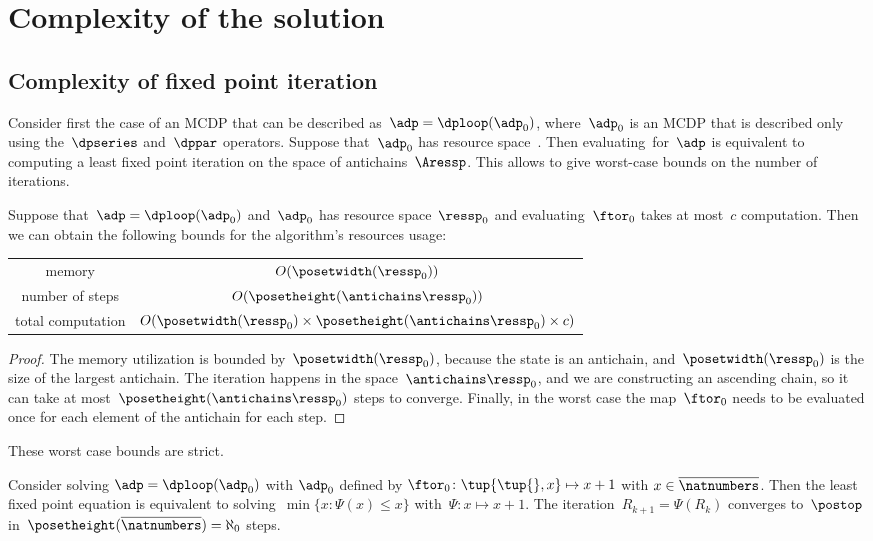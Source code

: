 

\section{Complexity of the solution}

\subsection{Complexity of fixed point iteration}

Consider first the case of an MCDP that can be described as~$\adp=\dploop(\adp_{0})$,
where~$\adp_{0}$ is an MCDP that is described only using the~$\dpseries$
and~$\dppar$ operators. Suppose that~$\adp_{0}$ has resource
space~\ressp. Then evaluating~\ftor for~$\adp$ is equivalent
to computing a least fixed point iteration on the space of antichains~$\Aressp$.
This allows to give worst-case bounds on the number of iterations.

\begin{proposition}
    \label{prop:complexity}
    Suppose that~$\adp=\dploop(\adp_{0})$ and~$\adp_{0}$ has resource space~$\ressp_{0}$ and evaluating~$\ftor_{0}$ takes at most~$c$ computation. Then we can obtain the following bounds for the algorithm's resources usage:

    \smallskip{}
    \begin{tabular}{cc}
        memory & $O(\posetwidth(\ressp_{0}))$\tabularnewline
        number of steps & $O(\posetheight(\antichains\ressp_{0}))$\tabularnewline
        total computation & $O(\posetwidth(\ressp_{0})\times\posetheight(\antichains\ressp_{0})\times c)$\tabularnewline
    \end{tabular}

\end{proposition}
\begin{proof}
    The memory utilization is bounded by~$\posetwidth(\ressp_{0})$, because the state is an antichain, and~$\posetwidth(\ressp_{0})$ is the size of the largest antichain. The iteration happens in the space~$\antichains\ressp_{0}$, and we are constructing an ascending chain, so it can take at most~$\posetheight(\antichains\ressp_{0})$ steps to converge. Finally, in the worst case the map~$\ftor_{0}$ needs to be evaluated once for each element of the antichain for each step.
\end{proof}
These worst case bounds are strict.
\begin{example}
    Consider solving $\adp=\dploop(\adp_{0})$ with $\adp_{0}$
    defined by $\ftor_{0}\colon\tup{ \tup{ } ,x} \mapsto x+1$
    with $x\in\overline{\natnumbers}$. Then the least fixed point equation
    is equivalent to solving~$\min\{x\colon\Psi(x)\leq x\}$ with~$\Psi:x\mapsto x+1$.
    The iteration~$R_{k+1}=\Psi(R_{k})$ converges to~$\postop$ in~$\posetheight(\overline{\natnumbers})=\aleph_{0}$
    steps.
\end{example}

